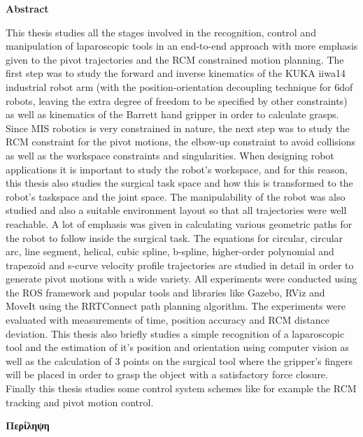 \pagestyle{empty}
{\textbf{Abstract}\\[1cm]}

This thesis studies all the stages involved in the recognition, control and manipulation of laparoscopic tools in an end-to-end approach with more emphasis given to the pivot trajectories and the RCM constrained motion 
planning. The first step was to study the forward and inverse kinematics of the KUKA iiwa14 industrial robot arm (with the position-orientation decoupling technique for 6dof robots, leaving the extra degree of freedom to be 
specified by other constraints) as well as kinematics of the Barrett hand gripper in order to calculate grasps. Since MIS robotics is very constrained in nature, the next step was to study the RCM constraint for the pivot 
motions, the elbow-up constraint to avoid collisions as well as the workspace constraints and singularities. When designing robot applications it is important to study the robot’s workspace, and for this reason, this thesis 
also studies the surgical task space and how this is transformed to the robot’s taskspace and the joint space. The manipulability of the robot was also studied and also a suitable environment layout so that all trajectories 
were well reachable. A lot of emphasis was given in calculating various geometric paths for the robot to follow inside the surgical task. The equations for circular, circular arc, line segment, helical, cubic spline, b-spline, 
higher-order polynomial and trapezoid and s-curve velocity profile trajectories are studied in detail in order to generate pivot motions with a wide variety. All experiments were conducted using the ROS framework and popular 
tools and libraries like Gazebo, RViz and MoveIt using the RRTConnect path planning algorithm. The experiments were evaluated with measurements of time, position accuracy and RCM distance deviation. This thesis also briefly 
studies a simple recognition of a laparoscopic tool and the estimation of it’s position and orientation using computer vision as well as the calculation of 3 points on the surgical tool where the gripper’s fingers will be 
placed in order to grasp the object with a satisfactory force closure. Finally this thesis studies some control system schemes like for example the RCM tracking and pivot motion control.

\newpage{\pagestyle{empty}\cleardoublepage}

\newpage
\pagestyle{empty}
{\textbf{Περίληψη}\\[1cm]}

